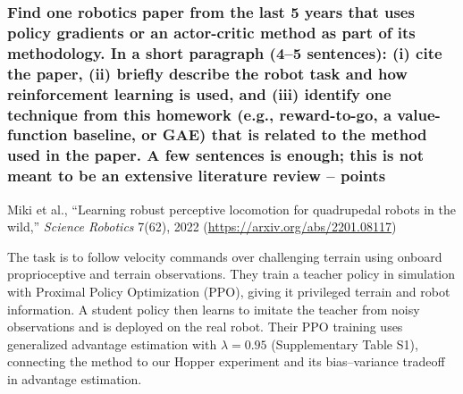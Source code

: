 \documentclass{article}
\begin{document}
\subsubsection{Find one robotics paper from the last 5 years that uses policy gradients or an actor-critic method as part of its methodology. 
    In a short paragraph (4--5 sentences): (i) cite the paper, (ii) briefly describe the robot task and how reinforcement learning is used, and (iii) identify one technique from this homework (e.g., reward-to-go, a value-function baseline, or GAE) that is related to the method used in the paper. A few sentences is enough; this is not meant to be an extensive literature review  --  points\rbrack
}
\begin{answer}[title=Q8.1.4,height=4cm,width=\linewidth]
\footnotesize
Miki et al., ``Learning robust perceptive locomotion for quadrupedal robots
in the wild,'' \textit{Science Robotics} 7(62), 2022
(\url{https://arxiv.org/abs/2201.08117})

The task is to follow velocity commands over challenging terrain using
onboard proprioceptive and terrain observations.
They train a teacher policy in simulation with Proximal Policy Optimization
(PPO), giving it privileged terrain and robot information.
A student policy then learns to imitate the teacher from noisy observations
and is deployed on the real robot.
Their PPO training uses generalized advantage estimation with $\lambda=0.95$
(Supplementary Table S1), connecting the method to our Hopper experiment
and its bias--variance tradeoff in advantage estimation.
\end{answer}
\end{document}
